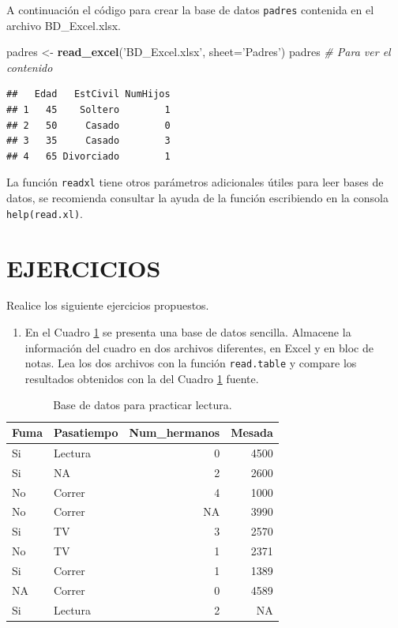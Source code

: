 \documentclass[10pt,]{krantz}
\makeatletter
\newenvironment{Shaded}{\begin{snugshade}}{\end{snugshade}}
\newcommand{\KeywordTok}[1]{\textcolor[rgb]{0.13,0.29,0.53}{\textbf{{#1}}}}
\newcommand{\DataTypeTok}[1]{\textcolor[rgb]{0.13,0.29,0.53}{{#1}}}
\newcommand{\StringTok}[1]{\textcolor[rgb]{0.31,0.60,0.02}{{#1}}}
\newcommand{\CommentTok}[1]{\textcolor[rgb]{0.56,0.35,0.01}{\textit{{#1}}}}
\newcommand{\NormalTok}[1]{{#1}}
\providecommand{\tightlist}{%
  \setlength{\itemsep}{0pt}\setlength{\parskip}{0pt}}
\newenvironment{kframe}{%
\medskip{}
\setlength{\fboxsep}{.8em}
 \def\at@end@of@kframe{}%
 \ifinner\ifhmode%
  \def\at@end@of@kframe{\end{minipage}}%
  \begin{minipage}{\columnwidth}%
 \fi\fi%
 \def\FrameCommand##1{\hskip\@totalleftmargin \hskip-\fboxsep
 \colorbox{shadecolor}{##1}\hskip-\fboxsep
     \hskip-\linewidth \hskip-\@totalleftmargin \hskip\columnwidth}%
 \MakeFramed {\advance\hsize-\width
   \@totalleftmargin\z@ \linewidth\hsize
   \@setminipage}}%
 {\par\unskip\endMakeFramed%
 \at@end@of@kframe}
\renewenvironment{Shaded}{\begin{kframe}}{\end{kframe}}
\makeatother
\begin{document}
A continuación el código para crear la base de datos \texttt{padres}
contenida en el archivo BD\_Excel.xlsx.

\begin{Shaded}
\begin{Highlighting}[]
\NormalTok{padres <-}\StringTok{ }\KeywordTok{read_excel}\NormalTok{(}\StringTok{'BD_Excel.xlsx'}\NormalTok{, }\DataTypeTok{sheet=}\StringTok{'Padres'}\NormalTok{)}
\NormalTok{padres  }\CommentTok{# Para ver el contenido}
\end{Highlighting}
\end{Shaded}

\begin{verbatim}
##   Edad   EstCivil NumHijos
## 1   45    Soltero        1
## 2   50     Casado        0
## 3   35     Casado        3
## 4   65 Divorciado        1
\end{verbatim}

La función \texttt{readxl} tiene otros parámetros adicionales útiles
para leer bases de datos, se recomienda consultar la ayuda de la función
escribiendo en la consola \texttt{help(read.xl)}.

\section*{EJERCICIOS}\label{ejercicios-3}


Realice los siguiente ejercicios propuestos.

\begin{enumerate}
\def\labelenumi{\arabic{enumi}.}
\tightlist
\item
  En el Cuadro \ref{tab:toy} se presenta una base de datos sencilla.
  Almacene la información del cuadro en dos archivos diferentes, en
  Excel y en bloc de notas. Lea los dos archivos con la función
  \texttt{read.table} y compare los resultados obtenidos con la del
  Cuadro \ref{tab:toy} fuente.
\end{enumerate}

\begin{table}

\caption{\label{tab:toy}Base de datos para practicar lectura.}
\centering
\begin{tabular}[t]{llrr}
\toprule
Fuma & Pasatiempo & Num\_hermanos & Mesada\\
\midrule
Si & Lectura & 0 & 4500\\
Si & NA & 2 & 2600\\
No & Correr & 4 & 1000\\
No & Correr & NA & 3990\\
Si & TV & 3 & 2570\\
\addlinespace
No & TV & 1 & 2371\\
Si & Correr & 1 & 1389\\
NA & Correr & 0 & 4589\\
Si & Lectura & 2 & NA\\
\bottomrule
\end{tabular}
\end{table}
\end{document}
